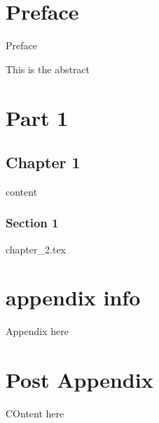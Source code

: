 \documentclass[letterpaper, 10pt, titlepage, oneside]{book}
\begin{document}

\part{Preface}
   Preface

\renewcommand{\abstractname}{Preface}
   This is the abstract \par

\mainmatter

\part{Part 1}

   \chapter{Chapter 1}
      content
      \section{Section 1}

{chapter_2.tex}

\appendix
\part{appendix info}
   Appendix here \par

\backmatter
\part{Post Appendix}
COntent here \cite{harris_multirate_book} \par



\end{document}
